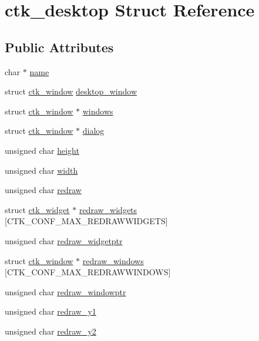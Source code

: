 \hypertarget{structctk__desktop}{}\section{ctk\+\_\+desktop Struct Reference}
\label{structctk__desktop}
\subsection*{Public Attributes}
\begin{DoxyCompactItemize}
\item 
char $\ast$ \hyperlink{structctk__desktop_aca68c318930404e60482bf1e69ea0852}{name}
\item 
struct \hyperlink{structctk__window}{ctk\+\_\+window} \hyperlink{structctk__desktop_ae50b40fab03969958331255e939616ee}{desktop\+\_\+window}
\item 
struct \hyperlink{structctk__window}{ctk\+\_\+window} $\ast$ \hyperlink{structctk__desktop_ab8349c5e65cb15988a848723dc5ec05f}{windows}
\item 
struct \hyperlink{structctk__window}{ctk\+\_\+window} $\ast$ \hyperlink{structctk__desktop_ab3eb78a18c8e9e744cf1b529041704d0}{dialog}
\item 
unsigned char \hyperlink{structctk__desktop_aed82ebe84d80a552b4766badac4bb9db}{height}
\item 
unsigned char \hyperlink{structctk__desktop_a7b6d5b276ee4defe23e90fd03088ac10}{width}
\item 
unsigned char \hyperlink{structctk__desktop_a51920c8b038bc60c96837d0120bf6cb9}{redraw}
\item 
struct \hyperlink{structctk__widget}{ctk\+\_\+widget} $\ast$ \hyperlink{structctk__desktop_add627f6c546946087f9a9b16c691b8dc}{redraw\+\_\+widgets} \mbox{[}C\+T\+K\+\_\+\+C\+O\+N\+F\+\_\+\+M\+A\+X\+\_\+\+R\+E\+D\+R\+A\+W\+W\+I\+D\+G\+E\+T\+S\mbox{]}
\item 
unsigned char \hyperlink{structctk__desktop_aaf90f191111d9b0ff3f8a10d4563964c}{redraw\+\_\+widgetptr}
\item 
struct \hyperlink{structctk__window}{ctk\+\_\+window} $\ast$ \hyperlink{structctk__desktop_a5d1ee2fbc501fb71c7690b91493b46c1}{redraw\+\_\+windows} \mbox{[}C\+T\+K\+\_\+\+C\+O\+N\+F\+\_\+\+M\+A\+X\+\_\+\+R\+E\+D\+R\+A\+W\+W\+I\+N\+D\+O\+W\+S\mbox{]}
\item 
unsigned char \hyperlink{structctk__desktop_a893796b824512c19839b54c28c035cb8}{redraw\+\_\+windowptr}
\item 
unsigned char \hyperlink{structctk__desktop_ae770b8567f0838de5ad83ce196b0a6ea}{redraw\+\_\+y1}
\item 
unsigned char \hyperlink{structctk__desktop_a870ac347ec560d19f9a0926c6bdf2b37}{redraw\+\_\+y2}
\end{DoxyCompactItemize}



